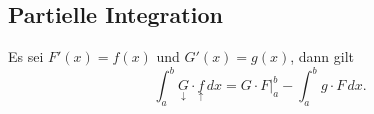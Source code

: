 \subsection{Partielle Integration}
    Es sei $F'(x) = f(x)$ und $G'(x) = g(x)$, dann gilt
    $$
        \int_a^b \underset{\downarrow}{G} \cdot \underset{\uparrow}{f} \, dx = G \cdot F \Big\rvert_a^b - \int_a^b g \cdot F \, dx.
    $$